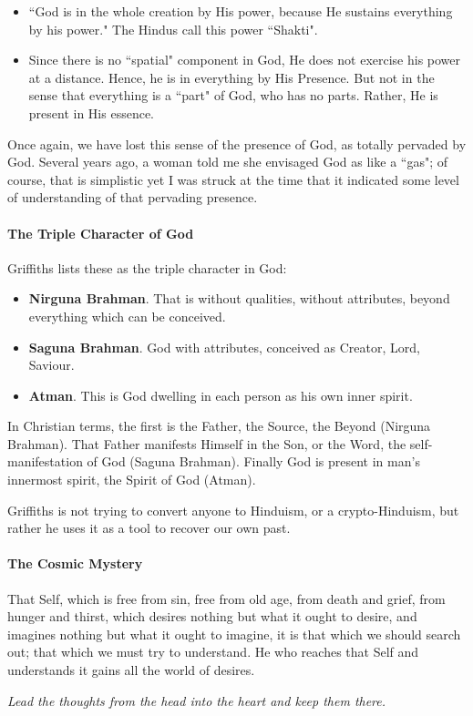 \begin{itemize}
\item ``God is in the whole creation by His power, because He sustains everything by his power." The Hindus call this power ``Shakti". 
\item Since there is no ``spatial" component in God, He does not exercise his power at a distance. Hence, he is in everything by His Presence. But not in the sense that everything is a ``part" of God, who has no parts. Rather, He is present in His essence. 
\end{itemize}
Once again, we have lost this sense of the presence of God, as totally pervaded by God. Several years ago, a woman told me she envisaged God as like a ``gas"; of course, that is simplistic yet I was struck at the time that it indicated some level of understanding of that pervading presence.

\paragraph{The Triple Character of God}
Griffiths lists these as the triple character in God:

\begin{itemize}
\item \textbf{Nirguna Brahman}. That is without qualities, without attributes, beyond everything which can be conceived. 
\item \textbf{Saguna Brahman}. God with attributes, conceived as Creator, Lord, Saviour. 
\item \textbf{Atman}. This is God dwelling in each person as his own inner spirit. 
\end{itemize}
In Christian terms, the first is the Father, the Source, the Beyond (Nirguna Brahman). That Father manifests Himself in the Son, or the Word, the self-manifestation of God (Saguna Brahman). Finally God is present in man's innermost spirit, the Spirit of God (Atman).

Griffiths is not trying to convert anyone to Hinduism, or a crypto-Hinduism, but rather he uses it as a tool to recover our own past.

\paragraph{The Cosmic Mystery}

\begin{quotex}
That Self, which is free from sin, free from old age, from death and grief, from hunger and thirst, which desires nothing but what it ought to desire, and imagines nothing but what it ought to imagine, it is that which we should search out; that which we must try to understand. He who reaches that Self and understands it gains all the world of desires.

\end{quotex}
\emph{Lead the thoughts from the head into the heart and keep them there.}

